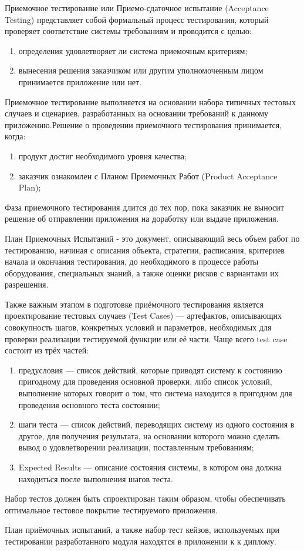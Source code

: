 Приемочное тестирование или Приемо-сдаточное испытание (Acceptance Testing) представляет собой формальный процесс
тестирования, который проверяет соответствие системы требованиям и проводится с целью:

\begin{enumerate}
\item определения удовлетворяет ли система приемочным критериям;
\item вынесения решения заказчиком или другим уполномоченным лицом принимается приложение или нет.
\end{enumerate}

Приемочное тестирование выполняется на основании набора типичных тестовых случаев и сценариев, разработанных на
основании требований к данному приложению.Решение о проведении приемочного тестирования принимается, когда:

\begin{enumerate}
\item продукт достиг необходимого уровня качества;
\item заказчик ознакомлен с Планом Приемочных Работ (Product Acceptance Plan);
\end{enumerate}

Фаза приемочного тестирования длится до тех пор, пока заказчик не выносит решение об отправлении приложения на
доработку или выдаче приложения.

План Приемочных Испытаний -  это документ, описывающий весь объем работ по тестированию, начиная с описания объекта,
стратегии, расписания, критериев начала и окончания тестирования, до необходимого в процессе работы оборудования,
специальных знаний, а также оценки рисков с вариантами их разрешения.

Также важным этапом в подготовке приёмочного тестирования является проектирование тестовых случаев (Test Cases) ---
артефактов, описывающих совокупность шагов, конкретных условий и параметров, необходимых для проверки реализации
тестируемой функции или её части. Чаще всего test case состоит из трёх частей:

\begin{enumerate}
\item предусловия --- список действий, которые приводят систему к состоянию пригодному для проведения основной
проверки, либо список условий, выполнение которых говорит о том, что система находится в пригодном для проведения
основного теста состоянии;
\item шаги теста --- список действий, переводящих систему из одного состояния в другое, для получения
результата, на основании которого можно сделать вывод о удовлетворении реализации, поставленным требованиям;
\item Expected Results --- описание состояния системы, в котором она должна находиться после выполнения шагов теста.
\end{enumerate}

Набор тестов должен быть спроектирован таким образом, чтобы обеспечивать оптимальное тестовое покрытие тестируемого
приложения.

План приёмочных испытаний, а также набор тест кейзов, используемых при тестировании разработанного модуля находятся в приложении к 
к диплому.


